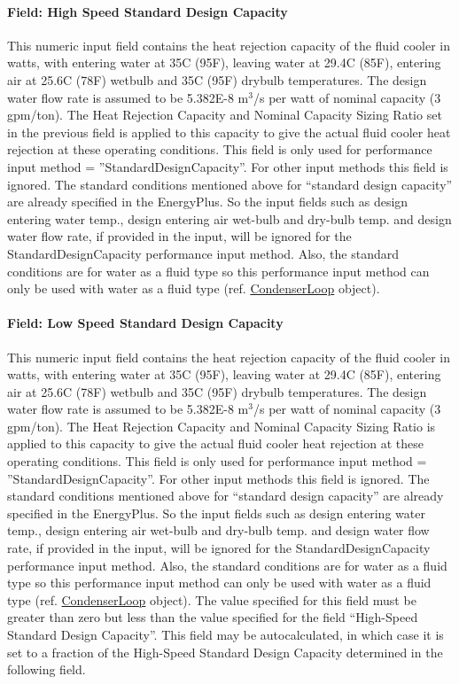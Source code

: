 \paragraph{Field: High Speed Standard Design Capacity}\label{field-high-speed-standard-design-capacity}

This numeric input field contains the heat rejection capacity of the fluid cooler in watts, with entering water at 35C (95F), leaving water at 29.4C (85F), entering air at 25.6C (78F) wetbulb and 35C (95F) drybulb temperatures. The design water flow rate is assumed to be 5.382E-8 m\(^{3}\)/s per watt of nominal capacity (3 gpm/ton). The Heat Rejection Capacity and Nominal Capacity Sizing Ratio set in the previous field is applied to this capacity to give the actual fluid cooler heat rejection at these operating conditions. This field is only used for performance input method = ''StandardDesignCapacity''. For other input methods this field is ignored. The standard conditions mentioned above for ``standard design capacity'' are already specified in the EnergyPlus. So the input fields such as design entering water temp., design entering air wet-bulb and dry-bulb temp. and design water flow rate, if provided in the input, will be ignored for the StandardDesignCapacity performance input method. Also, the standard conditions are for water as a fluid type so this performance input method can only be used with water as a fluid type (ref. \hyperref[condenserloop]{CondenserLoop} object).

\paragraph{Field: Low Speed Standard Design Capacity}\label{field-low-speed-standard-design-capacity}

This numeric input field contains the heat rejection capacity of the fluid cooler in watts, with entering water at 35C (95F), leaving water at 29.4C (85F), entering air at 25.6C (78F) wetbulb and 35C (95F) drybulb temperatures. The design water flow rate is assumed to be 5.382E-8 m\(^{3}\)/s per watt of nominal capacity (3 gpm/ton). The Heat Rejection Capacity and Nominal Capacity Sizing Ratio is applied to this capacity to give the actual fluid cooler heat rejection at these operating conditions. This field is only used for performance input method = ''StandardDesignCapacity''. For other input methods this field is ignored. The standard conditions mentioned above for ``standard design capacity'' are already specified in the EnergyPlus. So the input fields such as design entering water temp., design entering air wet-bulb and dry-bulb temp. and design water flow rate, if provided in the input, will be ignored for the StandardDesignCapacity performance input method. Also, the standard conditions are for water as a fluid type so this performance input method can only be used with water as a fluid type (ref. \hyperref[condenserloop]{CondenserLoop} object). The value specified for this field must be greater than zero but less than the value specified for the field ``High-Speed Standard Design Capacity''. This field may be autocalculated, in which case it is set to a fraction of the High-Speed Standard Design Capacity determined in the following field.

